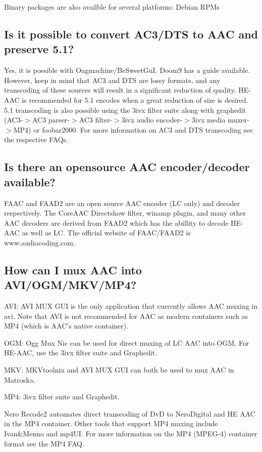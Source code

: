 ﻿\documentclass[12pt]{article}
\begin{document}
Binary packages are also availble for several platforms:
Debian
RPMs

\subsection{Is it possible to convert AC3/DTS to AAC and preserve 5.1?}

Yes, it is possible with Oagmachine/BeSweetGuI. Doom9 has a guide available. However, keep in mind
that AC3 and DTS are lossy formats, and any transcoding of these sources will result in a
significant reduction of quality. HE-AAC is recommended for 5.1 encodes when a great reduction of
size is desired. 5.1 transcoding is also possible using the 3ivx filter suite along with graphedit
(AC3-$>$AC3 parser-$>$AC3 filter-$>$3ivx audio encoder-$>$3ivx media muxer-$>$MP4) or foobar2000. For more
information on AC3 and DTS transcoding see the respective FAQs.

\subsection{Is there an opensource AAC encoder/decoder available?}

FAAC and FAAD2 are an open source AAC encoder (LC only) and decoder respectively. The CoreAAC
Directshow filter, winamp plugin, and many other AAC decoders are derived from FAAD2 which has the
abillity to decode HE-AAC as well as LC. The official website of FAAC/FAAD2 is www.audiocoding.com.

\subsection{How can I mux AAC into AVI/OGM/MKV/MP4?}

AVI: AVI MUX GUI is the only application that currently allows AAC muxing in avi. Note that AVI is
not recommended for AAC as modern containers such as MP4 (which is AAC's native container).

OGM: Ogg Mux Nic can be used for direct muxing of LC AAC into OGM. For HE-AAC, use the 3ivx filter
suite and Graphedit.

MKV: MKVtoolnix and AVI MUX GUI can both be used to mux AAC in Matroska.

MP4: 3ivx filter suite and Graphedit.

Nero Recode2 automates direct transcoding of DvD to NeroDigital and HE AAC in the MP4 container.
Other tools that support MP4 muxing include Ivan\&Menno and mp4UI. For more information on the MP4
(MPEG-4) container format see the MP4 FAQ.
\end{document}
